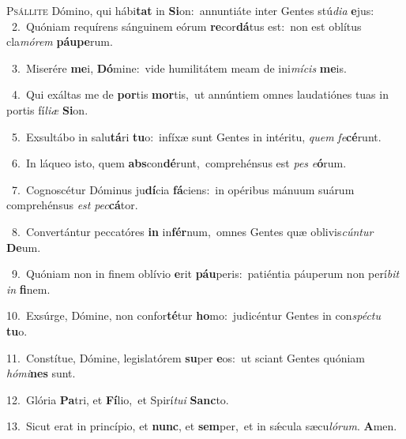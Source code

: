 \lettrine{\initial\textcolor{\initialcolor}{P}}{sállite} Dómino, qui hábi\textbf{tat} in \textbf{Si}\-on:~\star annuntiáte inter Gentes stú\-\textit{di}\-\textit{a} \textbf{e}\-jus:\\
{\numbfont\textcolor{\numbcolor}{~2.}}~Quóniam requírens sánguinem eórum \textbf{re}\-cor\-\textbf{dá}\-tus est:~\star non est oblítus cla\-\textit{mó}\-\textit{rem} \textbf{páu}\-\textbf{pe}rum.\par
{\numbfont\textcolor{\numbcolor}{~3.}}~Miserére \textbf{me}\-i, \textbf{Dó}\-mine:~\star vide humilitátem meam de ini\-\textit{mí}\-\textit{cis} \textbf{me}\-is.\par
{\numbfont\textcolor{\numbcolor}{~4.}}~Qui exáltas me de \textbf{por}\-tis \textbf{mor}\-tis,~\star ut annúntiem omnes laudatiónes tuas in portis fí\-\textit{li}\-\textit{æ} \textbf{Si}\-on.\par
{\numbfont\textcolor{\numbcolor}{~5.}}~Exsultábo in salu\-\textbf{tá}\-ri \textbf{tu}\-o:~\star infíxæ sunt Gentes in intéritu, \textit{quem} \textit{fe}\-\textbf{cé}runt.\par
{\numbfont\textcolor{\numbcolor}{~6.}}~In láqueo isto, quem \textbf{abs}\-con\-\textbf{dé}\-runt,~\star comprehénsus est \textit{pes} \textit{e}\-\textbf{ó}rum.\par
{\numbfont\textcolor{\numbcolor}{~7.}}~Cognoscétur Dóminus ju\-\textbf{dí}\-cia \textbf{fá}\-ciens:~\star in opéribus mánuum suárum comprehénsus \textit{est} \textit{pec}\-\textbf{cá}tor.\par
{\numbfont\textcolor{\numbcolor}{~8.}}~Convertántur peccatóres \textbf{in} in\-\textbf{fér}\-num,~\star omnes Gentes quæ oblivis\-\textit{cún}\-\textit{tur} \textbf{De}\-um.\par
{\numbfont\textcolor{\numbcolor}{~9.}}~Quóniam non in finem oblívio \textbf{e}\-rit \textbf{páu}\-peris:~\star patiéntia páuperum non perí\textit{bit} \textit{in} \textbf{fi}\-nem.\par
{\numbfont\textcolor{\numbcolor}{10.}}~Exsúrge, Dómine, non confor\-\textbf{té}\-tur \textbf{ho}\-mo:~\star judicéntur Gentes in con\-\textit{spéc}\-\textit{tu} \textbf{tu}\-o.\par
{\numbfont\textcolor{\numbcolor}{11.}}~Constítue, Dómine, legislatórem \textbf{su}\-per \textbf{e}\-os:~\star ut sciant Gentes quóniam \textit{hó}\-\textit{mi}\textbf{nes} sunt.\par
{\numbfont\textcolor{\numbcolor}{12.}}~Glória \textbf{Pa}\-tri, et \textbf{Fí}\-lio,~\star et Spirí\-\textit{tu}\-\textit{i} \textbf{Sanc}\-to.\par
{\numbfont\textcolor{\numbcolor}{13.}}~Sicut erat in princípio, et \textbf{nunc}\-, et \textbf{sem}\-per,~\star et in sǽcula sæcu\-\textit{ló}\-\textit{rum}. \textbf{A}\-men.\par

